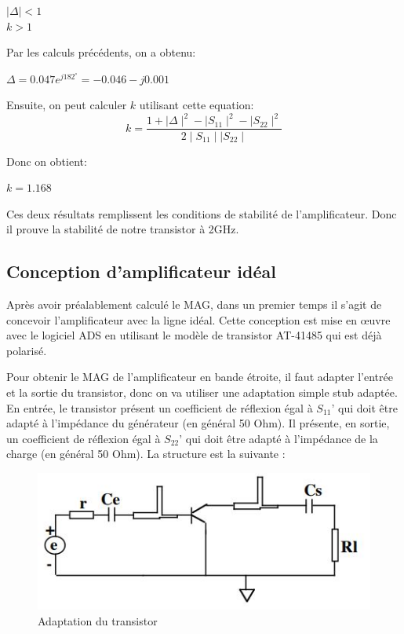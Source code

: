 \documentclass[french]{article}
\begin{document}
{\centering
$\mid \Delta\mid<1$\\
$k>1$\\
}

Par les calculs précédents, on a obtenu:

{\centering
$\Delta=0.047e^{j182^{\circ}}=-0.046-j0.001$\\
}

Ensuite, on peut calculer $k$ utilisant cette equation:
\begin{equation}
	k=\frac{1+\mid \Delta\mid^{2}-\mid S_{11}\mid^{2}-\mid S_{22}\mid^{2}}{2\mid S_{11}\mid \mid S_{22}\mid}
\end{equation}

Donc on obtient:

{\centering
	$k=1.168$\\
}

Ces deux résultats remplissent les conditions de stabilité de l'amplificateur. Donc il prouve la stabilité de notre transistor à 2GHz.


\subsection{Conception d’amplificateur idéal}
Après avoir préalablement calculé le MAG, dans un premier temps il s’agit de concevoir l’amplificateur avec la ligne idéal. Cette conception est mise en œuvre avec le logiciel ADS en utilisant le modèle de transistor AT-41485 qui est déjà polarisé.

Pour obtenir le MAG de l’amplificateur en bande étroite, il faut adapter l’entrée et la sortie du transistor, donc on va utiliser une adaptation simple stub adaptée. En entrée, le transistor présent un coefficient de réflexion égal à $S_{11}’$ qui doit être adapté à l’impédance du générateur (en général 50 Ohm). Il présente, en sortie, un coefficient de réflexion égal à $S_{22}’$ qui doit être adapté à l’impédance de la charge (en général 50 Ohm). La structure est la suivante :

\begin{figure}[H]
	\centering
	\includegraphics[width=0.8\linewidth]{../5SynthAmp/adaptation_e_s}
	\caption{Adaptation du transistor}
	\label{fig:adaptation_e_s}
\end{figure}
\end{document}
